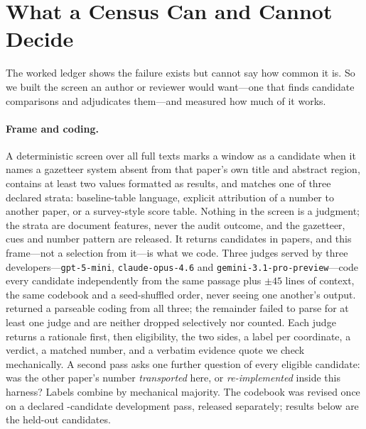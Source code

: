 \documentclass[11pt]{article}
\begin{document}
\section{What a Census Can and Cannot Decide}
\label{sec:census}

The worked ledger shows the failure exists but cannot say how common it is. So
we built the screen an author or reviewer would want---one that finds candidate
comparisons and adjudicates them---and measured how much of it works.

\paragraph{Frame and coding.}
A deterministic screen over all \FrameScreened{} full texts marks a window as a
candidate when it names a gazetteer system absent from that paper's own title
and abstract region, contains at least two values formatted as results, and
matches one of three declared strata: baseline-table language, explicit
attribution of a number to another paper, or a survey-style score table. Nothing
in the screen is a judgment; the strata are document features, never the audit
outcome, and the gazetteer, cues and number pattern are released. It returns \FrameCandidates{} candidates in \FrameFiles{} papers, and
this frame---not a selection from it---is what we code. Three judges served by
three developers---\texttt{gpt-5-mini}, \texttt{claude-opus-4.6} and
\texttt{gemini-3.1-pro-preview}---code every candidate independently from the
same passage plus $\pm45$ lines of context, the same codebook and a
seed-shuffled order, never seeing one another's output. \CensusCoded{} returned
a parseable coding from all three; the remainder failed to parse for at least
one judge and are neither dropped selectively nor counted. Each judge returns a
rationale first, then eligibility, the two sides, a label per coordinate, a
verdict, a matched number, and a verbatim evidence quote we check mechanically.
A second pass asks one further question of every eligible candidate: was the
other paper's number \emph{transported} here, or \emph{re-implemented} inside
this harness? Labels combine by mechanical majority. The codebook was revised once on a
declared \CensusDevSize{}-candidate development pass, released separately;
results below are the \CensusHeldout{} held-out candidates.


\end{document}
